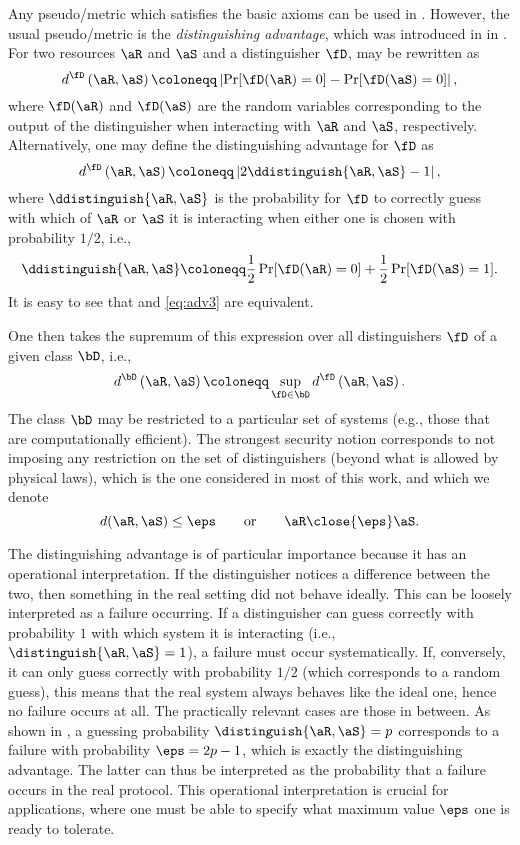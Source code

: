 Any pseudo\-/metric which satisfies the basic axioms can be used in
. However, the usual pseudo\-/metric is the
\emph{distinguishing advantage}, which was introduced in
 in . For two resources $\aR$
and $\aS$ and a distinguisher $\fD$,  may be rewritten
as
  \begin{equation}
  \label{eq:adv2} 
    d^{\fD}\left(\aR,\aS\right) \coloneqq \left| \Pr[\fD(\aR) = 0] - \Pr[\fD(\aS) = 0] \right|,
  \end{equation}
  where $\fD(\aR)$ and $\fD(\aS)$ are the random variables
  corresponding to the output of the distinguisher when interacting
  with $\aR$ and $\aS$, respectively. Alternatively, one may
    define the distinguishing advantage for $\fD$ as
\begin{equation}
  \label{eq:adv3}
  d^{\fD}\left(\aR,\aS\right) \coloneqq \left| 2\ddistinguish{\aR,\aS} - 1
  \right|,
\end{equation}
where $\ddistinguish{\aR,\aS}$ is the probability for $\fD$ to
correctly guess with which of $\aR$ or $\aS$ it is interacting when
either one is chosen with probability $1/2$, i.e.,
\[\ddistinguish{\aR,\aS} \coloneqq \frac{1}{2} \Pr[\fD(\aR) = 0] + \frac{1}{2}
  \Pr[\fD(\aS) = 1].\] It is easy to see that  and
\eqref{eq:adv3} are equivalent.

One then takes the supremum of this expression over all distinguishers
$\fD$ of a given class $\bD$, i.e.,
  \begin{equation}
  \label{eq:adv4} 
  d^{\bD}\left(\aR,\aS\right)  \coloneqq \sup_{\fD \in \bD} d^{\fD}\left(\aR,\aS\right).
  \end{equation}
  The class $\bD$ may be restricted to a particular set of systems
  (e.g., those that are computationally efficient). The strongest
  security notion corresponds to not imposing any restriction on the
  set of distinguishers (beyond what is allowed by physical laws),
  which is the one considered in most of this work, and which we
  denote
\[
  d(\aR,\aS) \leq \eps \qquad \text{or} \qquad \aR \close{\eps} \aS.
\]
  
The distinguishing advantage is of particular importance because it
has an operational interpretation. If the distinguisher notices a
difference between the two, then something in the real setting did not
behave ideally. This can be loosely interpreted as a failure
occurring. If a distinguisher can guess correctly with probability $1$
with which system it is interacting (i.e.,
$\distinguish{\aR,\aS} = 1$), a failure must occur systematically. If,
conversely, it can only guess correctly with probability $1/2$ (which
corresponds to a random guess), this means that the real system always
behaves like the ideal one, hence no failure occurs at all. The
practically relevant cases are those in between. As shown in
, a guessing probability
$ \distinguish{\aR,\aS} = p$ corresponds to a failure with probability
$\eps = 2p-1$, which is exactly the distinguishing advantage. The
latter can thus be interpreted as the probability that a failure
occurs in the real protocol. This operational interpretation is
crucial for applications, where one must be able to specify what
maximum value $\eps$ one is ready to tolerate.


